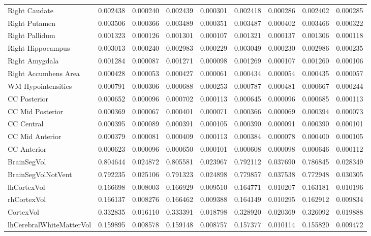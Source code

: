 \documentclass[diagnostics,article,accept,pdftex,moreauthors]{Definitions/mdpi}
\begin{document}
\begin{table}[H]
\begin{tabular}{lcccccccc}
Right Caudate & 0.002438 & 0.000240 & 0.002439 & 0.000301 & 0.002418 & 0.000286 & 0.002402 & 0.000285 \\
Right Putamen & 0.003506 & 0.000366 & 0.003489 & 0.000351 & 0.003487 & 0.000402 & 0.003466 & 0.000322 \\
Right Pallidum & 0.001323 & 0.000126 & 0.001301 & 0.000107 & 0.001321 & 0.000137 & 0.001306 & 0.000118 \\
Right Hippocampus & 0.003013 & 0.000240 & 0.002983 & 0.000229 & 0.003049 & 0.000230 & 0.002986 & 0.000235 \\
Right Amygdala & 0.001284 & 0.000087 & 0.001271 & 0.000098 & 0.001269 & 0.000107 & 0.001260 & 0.000106 \\
Right Accumbens Area & 0.000428 & 0.000053 & 0.000427 & 0.000061 & 0.000434 & 0.000054 & 0.000435 & 0.000057 \\
WM Hypointensities & 0.000791 & 0.000306 & 0.000688 & 0.000253 & 0.000787 & 0.000481 & 0.000667 & 0.000244 \\
CC Posterior & 0.000652 & 0.000096 & 0.000702 & 0.000113 & 0.000645 & 0.000096 & 0.000685 & 0.000113 \\
CC Mid Posterior & 0.000369 & 0.000067 & 0.000401 & 0.000071 & 0.000366 & 0.000069 & 0.000394 & 0.000073 \\
CC Central & 0.000395 & 0.000089 & 0.000391 & 0.000105 & 0.000390 & 0.000091 & 0.000390 & 0.000101 \\
CC Mid Anterior & 0.000379 & 0.000081 & 0.000409 & 0.000113 & 0.000384 & 0.000078 & 0.000400 & 0.000105 \\
CC Anterior & 0.000623 & 0.000096 & 0.000650 & 0.000101 & 0.000608 & 0.000098 & 0.000646 & 0.000112 \\
BrainSegVol & 0.804644 & 0.024872 & 0.805581 & 0.023967 & 0.792112 & 0.037690 & 0.786845 & 0.028349 \\
BrainSegVolNotVent & 0.792235 & 0.025106 & 0.791323 & 0.024898 & 0.779857 & 0.037538 & 0.772948 & 0.030305 \\
lhCortexVol & 0.166698 & 0.008003 & 0.166929 & 0.009510 & 0.164771 & 0.010207 & 0.163181 & 0.010196 \\
rhCortexVol & 0.166137 & 0.008276 & 0.166462 & 0.009388 & 0.164149 & 0.010295 & 0.162912 & 0.009834 \\
CortexVol & 0.332835 & 0.016110 & 0.333391 & 0.018798 & 0.328920 & 0.020369 & 0.326092 & 0.019888 \\
lhCerebralWhiteMatterVol & 0.159895 & 0.008578 & 0.159148 & 0.008757 & 0.157377 & 0.010114 & 0.155820 & 0.009472 \\

\end{tabular}
\end{table}
\end{document}

